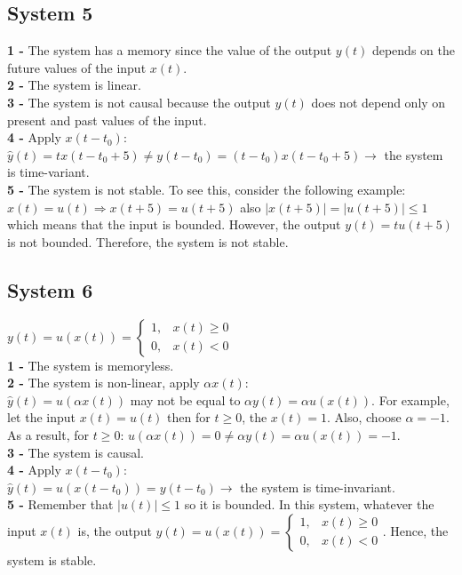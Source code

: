 \documentclass[12pt]{article}
\begin{document}
    \subsection*{System 5}
    \textbf{1 - }The system has a memory since the value of the output \(y(t)\) depends on
    the future values of the input \(x(t)\). \\
    \textbf{2 - }The system is linear.\\
    \textbf{3 - }The system is not causal because the output \(y(t)\) does not depend only on
    present and past values of the input. \\
    \textbf{4 - }Apply \(x(t-t_0)\):\\
    \(\hat{y}(t) = tx(t-t_0+5) \neq y(t-t_0) = (t-t_0)x(t-t_0+5) \longrightarrow\) the system is time-variant. \\ 
    \textbf{5 - }The system is not stable. To see this, consider the following example: \\
    \(x(t) = u(t) \Rightarrow x(t+5) = u(t+5)\) also 
    \(\left\lvert x(t+5)\right\rvert  = \left\lvert u(t+5)\right\rvert  \leq 1\) 
    which means that the input is bounded. However, the output \(y(t) = tu(t+5)\) is not bounded. Therefore, the system is not stable.\\
    \subsection*{System 6}
    \(y(t) = u(x(t)) = \begin{cases}
      1,& x(t) \geq 0\\
      0,& x(t) < 0
    \end{cases} \)\\
    \textbf{1 - }The system is memoryless. \\
    \textbf{2 - }The system is non-linear, apply \(\alpha x(t)\): \\
    \(\hat{y}(t) = u(\alpha x(t))\) may not be equal to \(\alpha y(t) = \alpha u(x(t))\). 
    For example, let the input \(x(t) = u(t)\) then for \(t \geq 0 \), the \(x(t) = 1\).
    Also, choose \(\alpha = -1\). As a result, for \(t \geq 0 \): \(u(\alpha x(t)) = 0 \neq \alpha y(t) = \alpha u(x(t)) = -1\).\\ 
    \textbf{3 - }The system is causal. \\
    \textbf{4 - }Apply \(x(t-t_0)\):\\
    \(\hat{y}(t) = u(x(t-t_0)) = y(t-t_0) \longrightarrow\) the system is time-invariant.\\
    \textbf{5 - }Remember that \(\left\lvert u(t)\right\rvert  \leq 1\) so it is bounded. In this system, whatever the input \(x(t)\)  is, the output 
    \(y(t) = u(x(t)) = \begin{cases}
      1,& x(t) \geq 0\\
      0,& x(t) < 0
    \end{cases}\). Hence, the system is stable. \\ 
 
\end{document}
